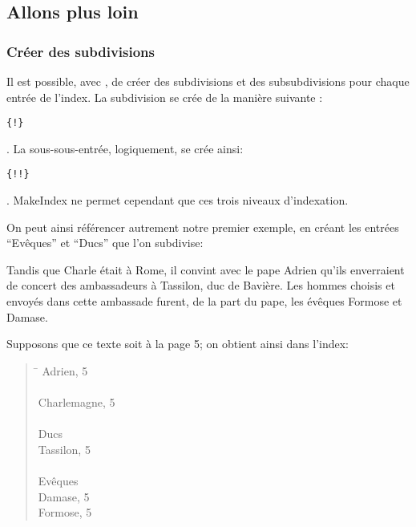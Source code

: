 \subsection{Allons plus loin}
\subsubsection{Créer des subdivisions}

Il est possible, avec ,  de créer des subdivisions et des subsubdivisions  pour chaque entrée de l'index. La subdivision se crée de la manière suivante : \begin{english}\verb|{|\verb|!|\verb|}|\end{english}. La sous-sous-entrée, logiquement, se crée ainsi: \begin{english}\verb|{|\verb|!|\verb|!|\verb|}|\end{english}. MakeIndex ne permet cependant que ces trois niveaux d'indexation.

On peut ainsi référencer autrement notre premier exemple, en créant les entrées \enquote{Evêques} et \enquote{Ducs} que l'on subdivise:

\begin{latexcode}
Tandis que Charle était à Rome, il convint 
avec le pape Adrien qu’ils enverraient de concert 
des ambassadeurs à Tassilon, duc de Bavière.
\textelp{}
Les hommes choisis et envoyés dans cette ambassade furent, de la 
part du pape, les évêques Formose
et Damase\textelp{}.
\end{latexcode}


Supposons que ce texte soit à la page 5; on obtient ainsi dans l'index:
\begin{quotation}
\begin{tabbing}
\hspace{0,5cm}  \= \kill
Adrien, 5 \\
\\
Charlemagne, 5 \\
\\
Ducs \\
\> Tassilon, 5\\
\\
Evêques \\
\> Damase, 5\\
\> Formose, 5\\
\end{tabbing}
\end{quotation}



